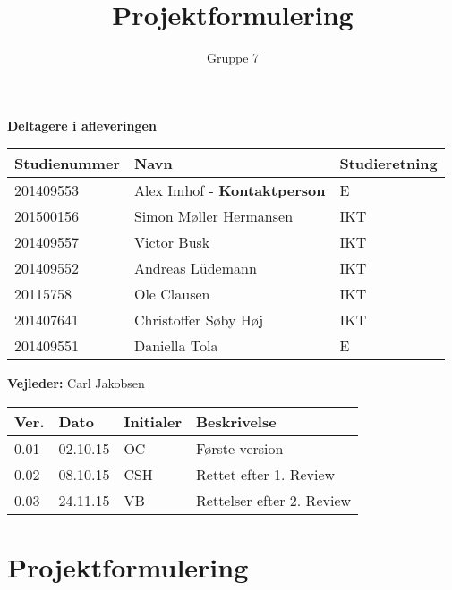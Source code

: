 \documentclass[oneside]{memoir}
\title{Projektformulering}
\author{Gruppe 7}
\begin{document}
		\maketitle
	\textbf{Deltagere i afleveringen}
			\begin{table}[H]
		\centering
		\label{my-label}
		\begin{tabular}{|l|l|l|}
			\hline
			Studienummer & Navn                   & Studieretning \\ \hline
			201409553    & Alex Imhof - \textbf{Kontaktperson } &E\\ \hline
			201500156    & Simon Møller Hermansen & IKT           \\ \hline
			201409557    & Victor Busk            & IKT           \\ \hline
			201409552    & Andreas Lüdemann       & IKT           \\ \hline
			20115758     & Ole Clausen            & IKT           \\ \hline
			201407641    & Christoffer Søby Høj   & IKT           \\ \hline
			201409551    & Daniella Tola          & E             \\ \hline
		\end{tabular}
	\end{table}
\begin{flushleft}
		\textbf{Vejleder: } Carl Jakobsen
\end{flushleft}

\begin{table}[]
	\centering
	\label{my-label}
	\begin{tabular}{|l|l|l|l|}
		\hline
		Ver. & Dato     & Initialer & Beskrivelse    \\ \hline
		0.01 & 02.10.15 & OC        & Første version \\ \hline
		0.02 & 08.10.15 & CSH		& Rettet efter 1. Review \\ \hline
		0.03 & 24.11.15 & VB		& Rettelser efter 2. Review \\ \hline
	\end{tabular}
\end{table}

	\newpage
		\tableofcontents
		
\chapter{Projektformulering}
\end{document}
